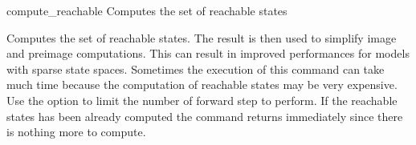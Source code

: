 \begin{nusmvCommand}{compute\_reachable} {Computes the set of reachable states}


Computes the set of reachable states. The result is then used to
simplify image and preimage computations. This can result in improved
performances for models with sparse state spaces. Sometimes the
execution of this command can take much time because the computation
of reachable states may be very expensive. Use the  option
to limit the number of forward step to perform.  If the reachable
states has been already computed the command returns immediately since
there is nothing more to compute.

\begin{cmdOpt}
  
\end{cmdOpt}

\end{nusmvCommand}
